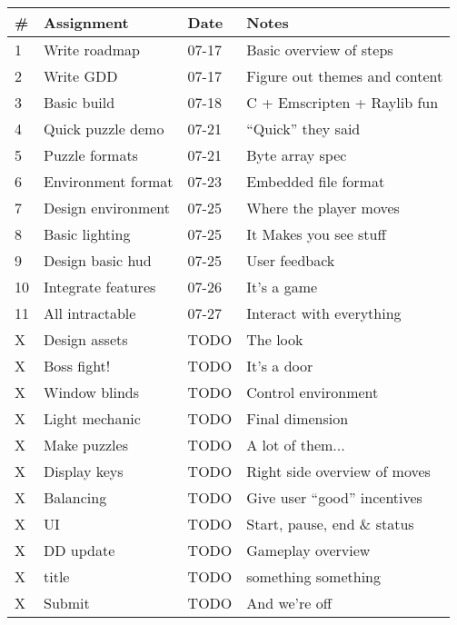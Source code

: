 \documentclass[12pt, letterpaper]{article}
\begin{document}
\bgroup
\def\arraystretch{1.5}
\begin{tabular}{ R{0.4cm} p{4cm} p{1.5cm} p{5.5cm} }
\toprule
{} & \textbf{Assignment} & \textbf{Date} & \textbf{Notes} \\ 
 & Write roadmap & 07-17 & Basic overview of steps \\
2 & Write GDD & 07-17 & Figure out themes and content \\
3 & Basic build & 07-18 & C + Emscripten + Raylib fun \\
4 & Quick puzzle demo & 07-21 & ``Quick'' they said \\
5 & Puzzle formats & 07-21 & Byte array spec \\
6 & Environment format & 07-23 & Embedded file format \\
7 & Design environment & 07-25 & Where the player moves \\
8 & Basic lighting & 07-25 & It Makes you see stuff \\
9 & Design basic hud & 07-25 & User feedback \\
10 & Integrate features & 07-26 & It's a game \\
11 & All intractable & 07-27 & Interact with everything \\

X & Design assets & TODO & The look \\
X & Boss fight! & TODO & It's a door \\
X & Window blinds & TODO & Control environment \\
X & Light mechanic & TODO & Final dimension \\

X & Make puzzles & TODO & A lot of them... \\
X & Display keys & TODO & Right side overview of moves \\
X & Balancing & TODO & Give user ``good'' incentives \\

X & UI & TODO & Start, pause, end \& status \\
X & DD update & TODO & Gameplay overview \\
X & title & TODO & something something \\
X & Submit & TODO & And we're off \\



\bottomrule
\end{tabular}
\egroup
\end{document}
